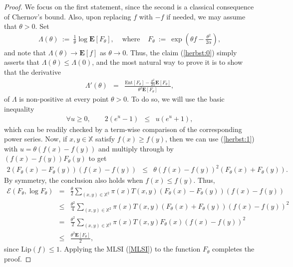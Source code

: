 \documentclass[12pt,final]{article}
\numberwithin{equation}{section}
\newcommand{\Lip}{\mathrm {Lip}}
\newcommand{\bE}{{\mathbf{E}}}
\newcommand{\Ent}{\mathrm{Ent}}
\newcommand{\cE}{\mathscr {E}}
\newcommand{\dX}{\mathbb{X}}
\begin{document}
\begin{proof}We focus on the first statement, since the second is a  classical consequence of Chernov's bound. Also, upon replacing $f$ with $-f$ if needed, we may assume that $\theta> 0$. Set
\begin{eqnarray*}
\Lambda(\theta) \ := \ \frac{1}{\theta}\log\bE\left[F_\theta \right],  & \textrm{ where } & F_\theta \ := \ \exp\left(\theta f-\frac{\theta^2}{2\alpha}\right),
\end{eqnarray*}
and note that $\Lambda(\theta)\to \bE[f]$ as $\theta\to 0$. Thus,  the claim (\ref{herbst:0}) simply asserts that $\Lambda(\theta)\le\Lambda(0)$, and the most natural way to prove it is to show that the derivative
\begin{eqnarray*}
\Lambda'(\theta) & = & \frac{\Ent\left[F_\theta \right]-\frac{\theta^2}{2\alpha}\bE[F_\theta]}{\theta^2\bE\left[F_\theta\right]},
\end{eqnarray*}
of $\Lambda$ is non-positive at every point $\theta> 0$. To do so, we will use the basic inequality
\begin{eqnarray}
\label{herbst:1}
\forall u\ge 0,\qquad 2(e^u - 1) & \le & u(e^u + 1),
\end{eqnarray}
which can be readily checked by a term-wise comparison of the corresponding  power series. Now, if  $x,y\in\dX$ satisfy $f(x)\ge f(y)$, then we can use (\ref{herbst:1}) with $u=\theta (f(x)-f(y))$ and multiply through by $(f(x)-f(y))F_\theta(y)$  to get 
\begin{eqnarray*}
2\left(F_\theta (x)-F_\theta (y)\right)\left(f(x)-f(y)\right)  & \le & \theta \left(f(x)-f(y)\right)^2\left(F_\theta (x)+F_\theta (y)\right). 
\end{eqnarray*}
By symmetry, the conclusion also holds when  $f(x)\le f(y)$. Thus,
\begin{eqnarray*}
\cE\left(F_\theta ,\log F_\theta \right) 
& = &  \frac{\theta }{2} \sum_{(x,y)\in \dX^2}\pi(x)T(x,y)\left(F_\theta (x)-F_\theta (y)\right)\left(f(x)-f(y)\right)\\
& \le & \frac{\theta^2}{4} \sum_{(x,y)\in \dX^2}\pi(x)T(x,y)\left(F_\theta (x)+F_\theta (y)\right)\left(f(x)-f(y)\right)^2\\
& = & \frac{\theta^2}{2} \sum_{(x,y)\in \dX^2}\pi(x)T(x,y)F_\theta (x) \left(f(x)-f(y)\right)^2\\
& \le & \frac{\theta^2  \bE[F_\theta]}{2},
\end{eqnarray*}
since $\Lip(f)\le 1$. Applying the MLSI (\ref{MLSI}) to the function $F_\theta$ completes the proof.
\end{proof}
\end{document}
